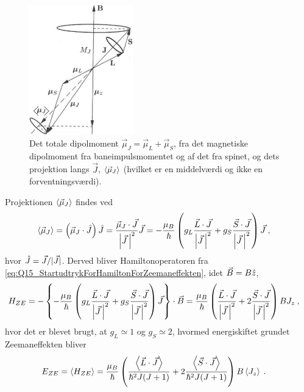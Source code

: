 \begin{figure}[!h]
    \centering
    \includegraphics[width=0.4\textwidth]{Q15/images/ZeemanEffectWithLSCoupling.PNG}
    \caption{Det totale dipolmoment $\Vec{\mu}_J = \Vec{\mu}_L + \Vec{\mu}_S$, fra det magnetiske dipolmoment fra baneimpulsmomentet og af det fra spinet, og dets projektion langs $\Vec{J}$, $\Braket{\Vec{\mu}_J}$ (hvilket er en middelværdi og ikke en forventningsværdi).}
    \label{fig:Q15_ZeemanEffectInThePresenceOfSpin}
\end{figure}

Projektionen $\Braket{\Vec{\mu}_J}$ findes ved
\begin{align}
    \Braket{\Vec{\mu}_J} &= \left(\Vec{\mu}_J \cdot \Hat{J}\right) \Hat{J} = \frac{\Vec{\mu}_J \cdot \Vec{J}}{\abs{\Vec{J} \,}^2} \Vec{J} = - \frac{\mu_B}{\hbar} \left( g_L \frac{\Vec{L} \cdot \Vec{J}}{\abs{\Vec{J} \,}^2} + g_S \frac{\Vec{S} \cdot \Vec{J}}{\abs{\Vec{J} \,}^2} \right) \Vec{J} \: ,
\end{align}
hvor $\Hat{J} = \Vec{J}/|\Vec{J}|$. Derved bliver Hamiltonoperatoren fra \cref{eq:Q15_StartudtrykForHamiltonForZeemaneffekten}, idet $\Vec{B} = B\Hat{z}$,
\begin{align}
    H_{ZE} &= -\left\{- \frac{\mu_B}{\hbar} \left( g_L \frac{\Vec{L} \cdot \Vec{J}}{\abs{\Vec{J} \,}^2} + g_S \frac{\Vec{S} \cdot \Vec{J}}{\abs{\Vec{J} \,}^2} \right) \Vec{J} \right\} \cdot \Vec{B} = \frac{\mu_B}{\hbar} \left( \frac{\Vec{L} \cdot \Vec{J}}{\abs{\Vec{J} \,}^2} + 2\frac{\Vec{S} \cdot \Vec{J}}{\abs{\Vec{J} \,}^2} \right) B J_z \: ,
\end{align}
hvor det er blevet brugt, at $g_L \simeq 1$ og $g_S \simeq 2$, hvormed energiskiftet grundet Zeemaneffekten bliver
\begin{align} \label{eq:Q15_EnergyZeemanInLSCouplingStart}
    E_{ZE} &= \Braket{H_{ZE}} = \frac{\mu_B}{\hbar} \left( \frac{\Braket{\Vec{L} \cdot \Vec{J}}}{\hbar^2 J(J+1)} + 2 \frac{\Braket{\Vec{S} \cdot \Vec{J}}}{\hbar^2 J(J+1)} \right) B \Braket{J_z} \: .
\end{align}

